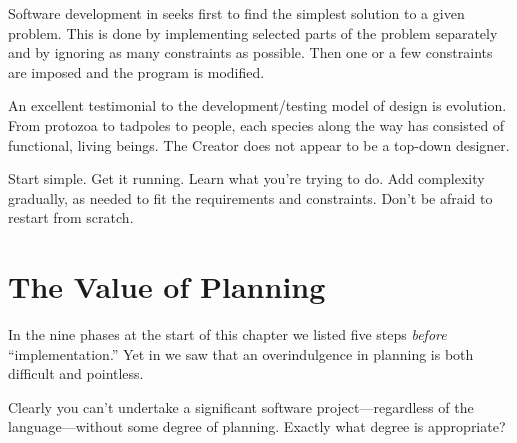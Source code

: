 \begin{tfquot}
Software development in \Forth{} seeks first to find the simplest
solution to a given problem. This is done by implementing selected
parts of the problem separately and by ignoring as many constraints as
possible. Then one or a few constraints are imposed and the program is
modified.
\end{tfquot}
An excellent testimonial to the development/testing model of design is
evolution. From protozoa to tadpoles to people, each species along the
way has consisted of functional, living beings. The Creator does not
appear to be a top-down designer.

\begin{tip}
Start simple. Get it running. Learn what you're trying to do. Add
complexity gradually, as needed to fit the requirements and
constraints. Don't be afraid to restart from scratch.
\end{tip}

\section{The Value of Planning}

In the nine phases at the start of this chapter we listed five steps
\emph{before} ``implementation.'' Yet in  we saw that an
overindulgence in planning is both difficult and pointless.

Clearly you can't undertake a significant software
project---regardless of the language---without some degree of planning.
Exactly what degree is appropriate?


